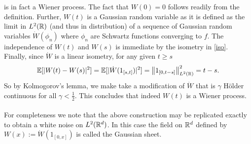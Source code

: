 \documentclass[12pt]{article}
\begin{document}
is in fact a Wiener process. The fact that $W(0)=0$ follows readily from the definition. Further,  $W(t)$ is a Gaussian random variable as it is defined as the limit in $L^2({\mathbb R})$ (and thus in distribution) of a sequence of Gaussian random variables $\dot{W}(\phi_n)$ where $\phi_n$ are Schwartz functions converging to $f$. The independence of $W(t)$ and  $W(s)$ is immediate by the isometry in \eqref{iso}. Finally, since $\dot{W}$ is a linear isometry, for any given $t\geq s$
\begin{equation*}
	\mathbb{E}[|W(t)-W(s)|^2]=\mathbb{E}[|\dot{W}(1_{[s,t]})|^2]=\norm{1_{[0,t-s]}}_{L^2({\mathbb R})}^2=t-s.
\end{equation*}
So by Kolmogorov's lemma, we make take a modification of $\dot{W}$  that  is $\gamma$ Hölder continuous for all $\gamma<\frac{1}{2}$. This concludes that indeed $W(t)$ is a Wiener process.\\\\
For completeness we note that the above construction may be replicated exactly to obtain a white noise on $L^2({\mathbb R}^d)$. In this case the field on ${\mathbb R}^d$ defined by $W(x):=\dot{W}(1_{[0,x]})$ is called the Gaussian sheet.


\end{document}

